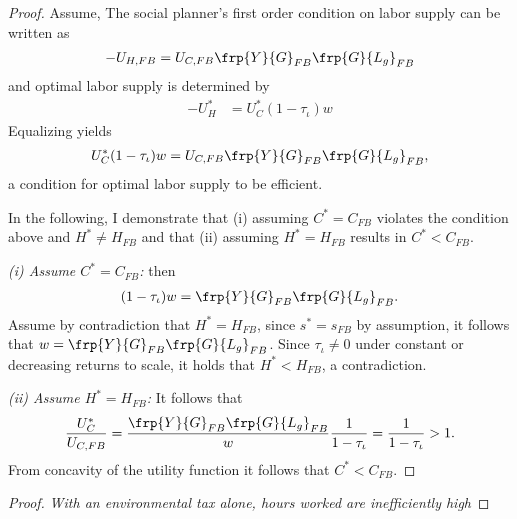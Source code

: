 \begin{proof}
Assume, 
The social planner's first order condition on labor supply can be written as
\begin{align}
-U_{H, FB}=U_{C, FB}\frp{Y}{G}_{FB}\frp{G}{L_g}_{FB}
\end{align}
and optimal labor supply is determined by
\begin{align}
-U^*_{H}&=U^*_C(1-\tau_\iota)w
\end{align}
Equalizing yields
\begin{align}
U_C^*(1-\tau_\iota)w=U_{C,FB}\frp{Y}{G}_{FB}\frp{G}{L_g}_{FB},
\end{align}
a condition for optimal labor supply to be efficient. 

In the following, I demonstrate that (i) assuming $C^*=C_{FB}$ violates the condition above and $H^*\neq H_{FB}$ and that (ii) assuming $H^*=H_{FB}$ results in $C^*<C_{FB}$. 

\textit{(i) Assume $C^*=C_{FB}$:}
then
\begin{align}
(1-\tau_\iota)w=\frp{Y}{G}_{FB}\frp{G}{L_g}_{FB}.
\end{align}
Assume by contradiction that $H^*=H_{FB}$, since $s^*=s_{FB}$ by assumption, it follows that $w=\frp{Y}{G}_{FB}\frp{G}{L_g}_{FB}$. 
Since $\tau_\iota\neq 0$ under constant or decreasing returns to scale, it holds that $H^*<H_{FB}$, a contradiction. 


%

\textit{(ii) Assume $H^*=H_{FB}$:} 
It follows that 
\begin{align}
\frac{U_C^*}{U_{C,FB}}=\frac{\frp{Y}{G}_{FB}\frp{G}{L_g}_{FB}}{w}\frac{1}{1-\tau_\iota}=\frac{1}{1-\tau_\iota}>1.
\end{align}
From concavity of the utility function it follows that $C^*<C_{FB}$. 
 \end{proof}


\begin{proof}\textit{With an environmental tax alone, hours worked are inefficiently high } 
\end{proof}
 

